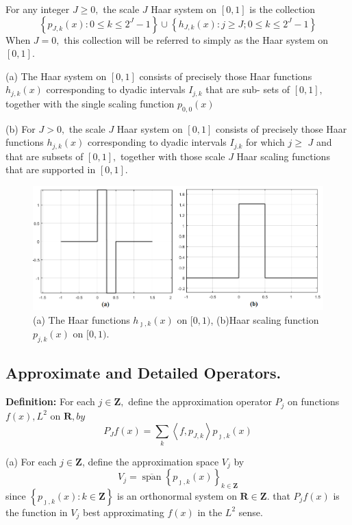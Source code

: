 For any integer $J \geq 0,$ the scale $J$ Haar system on $[0,1]$ is
the collection
$$
\left\{p_{J, k}(x): 0 \leq k \leq 2^{J}-1\right\} \cup\left\{h_{J, k}(x): j \geq J ; 0 \leq k \leq 2^{J}-1\right\}
$$
When $J=0,$ this collection will be referred to simply as the Haar system on $[0,1] .$

(a) The Haar system on $[0,1]$ consists of precisely those Haar functions $h_{j, k}(x)$ corresponding to dyadic intervals $I_{j, k}$ that are sub-
sets of $[0,1],$ together with the single scaling function $p_{0,0}(x)$

(b) For $J>0,$ the scale $J$ Haar system on $[0,1]$ consists of precisely those
Haar functions $h_{j, k}(x)$ corresponding to dyadic intervals $I_{j . k}$ for which $j \geq$
$J$ and that are subsets of $[0,1],$ together with those scale $J$ Haar scaling
functions that are supported in $[0,1] .$

\begin{figure}[h]
    \centering
    \includegraphics[width=\textwidth]{Haar_Basis.PNG}
    \caption{(a) The Haar functions $h_{\jmath, k}(x)$ on $[0,1)$, (b)Haar scaling function $p_{j, k}(x)$ on $[0,1)$.}
    \label{fig:Haar}
\end{figure}


\subsection*{Approximate and Detailed Operators.}

\par

\textbf{Definition:} For each $j \in \mathbf{Z},$ define the approximation operator $P_{j}$ on
functions $f(x), L^{2}$ on $\mathbf{R}, b y$
$$
P_{J} f(x)=\sum_{k}\left\langle f, p_{J, k}\right\rangle p_{\jmath, k}(x)
$$


(a) For each $j \in \mathbf{Z}$, define the approximation space $V_{j}$ by
$$
V_{j}=\overline{\operatorname{span}}\left\{p_{\jmath, k}(x)\right\}_{k \in \mathbf{Z}}
$$
since $\left\{p_{\jmath, k}(x): k \in \mathbf{Z}\right\}$ is an orthonormal system on $\mathbf{R} \in \mathbf{Z}$.
that $P_{j} f(x)$ is the function in $V_{j}$ best approximating $f(x)$ in the $L^{2}$ sense.


